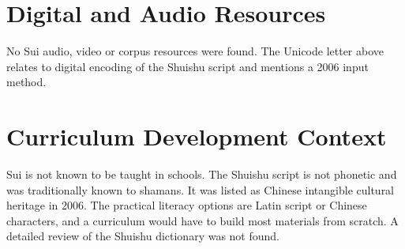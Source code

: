 \documentclass[12pt]{article}
\begin{document}
\section{Digital and Audio Resources}
No Sui audio, video or corpus resources were found. The Unicode letter above relates to digital encoding of the Shuishu script and mentions a 2006 input method.

\section{Curriculum Development Context}
Sui is not known to be taught in schools. The Shuishu script is not phonetic and was traditionally known to shamans. It was listed as Chinese intangible cultural heritage in 2006. The practical literacy options are Latin script or Chinese characters, and a curriculum would have to build most materials from scratch. A detailed review of the Shuishu dictionary was not found.
\end{document}
